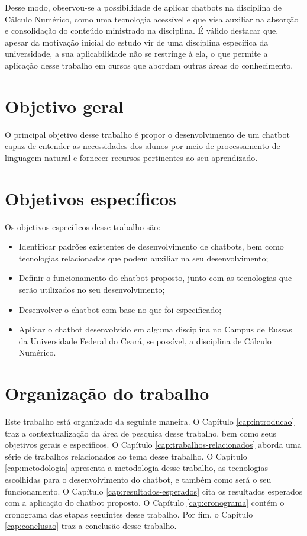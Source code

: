 Desse modo, observou-se a possibilidade de aplicar chatbots na disciplina de Cálculo Numérico, como uma tecnologia acessível e que visa auxiliar na absorção e consolidação do conteúdo ministrado na disciplina. É válido destacar que, apesar da motivação inicial do estudo vir de uma disciplina específica da universidade, a sua aplicabilidade não se restringe à ela, o que permite a aplicação desse trabalho em cursos que abordam outras áreas do conhecimento.

\section{Objetivo geral}
\label{sec:objetivo-geral}

O principal objetivo desse trabalho é propor o desenvolvimento de um chatbot capaz de entender as necessidades dos alunos por meio de processamento de linguagem natural e fornecer recursos pertinentes ao seu aprendizado.

\section{Objetivos específicos}
\label{sec:objetivos-especificos}

Os objetivos específicos desse trabalho são:

\begin{itemize}
	\item Identificar padrões existentes de desenvolvimento de chatbots, bem como tecnologias relacionadas que podem auxiliar na seu desenvolvimento;
    \item Definir o funcionamento do chatbot proposto, junto com as tecnologias que serão utilizados no seu desenvolvimento;
	\item Desenvolver o chatbot com base no que foi especificado;
	\item Aplicar o chatbot desenvolvido em alguma disciplina no Campus de Russas da Universidade Federal do Ceará, se possível, a disciplina de Cálculo Numérico.
\end{itemize}

\section{Organização do trabalho}
\label{sec:organizacao-trabalho}

Este trabalho está organizado da seguinte maneira. O Capítulo \ref{cap:introducao} traz a contextualização da área de pesquisa desse trabalho, bem como seus objetivos gerais e específicos. O Capítulo \ref{cap:trabalhos-relacionados} aborda uma série de trabalhos relacionados ao tema desse trabalho. O Capítulo \ref{cap:metodologia} apresenta a metodologia desse trabalho, as tecnologias escolhidas para o desenvolvimento do chatbot, e também como será o seu funcionamento. O Capítulo \ref{cap:resultados-esperados} cita os resultados esperados com a aplicação do chatbot proposto. O Capítulo \ref{cap:cronograma} contém o cronograma das etapas seguintes desse trabalho. Por fim, o Capítulo \ref{cap:conclusao} traz a conclusão desse trabalho.